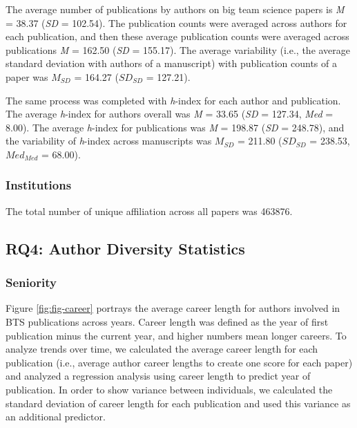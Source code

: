\documentclass[
  man,mask,floatsintext]{apa7}
\begin{document}
The average number of publications by authors on big team science papers
is \emph{M} = 38.37 (\emph{SD} = 102.54). The
publication counts were averaged across authors for each publication,
and then these average publication counts were averaged across
publications \emph{M} = 162.50 (\emph{SD} =
155.17). The average variability (i.e., the average
standard deviation with authors of a manuscript) with publication counts
of a paper was \(M_{SD}\) = 164.27 (\(SD_{SD}\) =
127.21).

The same process was completed with \emph{h}-index for each author and
publication. The average \emph{h}-index for authors overall was \emph{M} =
33.65 (\emph{SD} = 127.34, \emph{Med} = 8.00). The
average \emph{h}-index for publications was \emph{M} = 198.87 (\emph{SD}
= 248.78), and the variability of \emph{h}-index across
manuscripts was \(M_{SD}\) = 211.80 (\(SD_{SD}\) =
238.53, \(Med_{Med}\) = 68.00).

\hypertarget{institutions-1}{%
\subsubsection{Institutions}\label{institutions-1}}

The total number of unique affiliation across all papers was 463876.

\hypertarget{rq4-author-diversity-statistics-1}{%
\subsection{RQ4: Author Diversity Statistics}\label{rq4-author-diversity-statistics-1}}

\hypertarget{seniority-1}{%
\subsubsection{Seniority}\label{seniority-1}}

Figure \ref{fig:fig-career} portrays the average career length for
authors involved in BTS publications across years. Career length was
defined as the year of first publication minus the current year, and
higher numbers mean longer careers. To analyze trends over time, we
calculated the average career length for each publication (i.e., average
author career lengths to create one score for each paper) and analyzed a
regression analysis using career length to predict year of publication.
In order to show variance between individuals, we calculated the
standard deviation of career length for each publication and used this
variance as an additional predictor.
\end{document}
